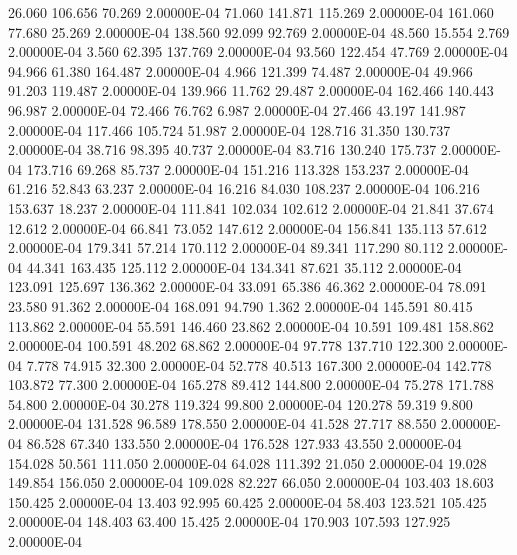     26.060   106.656    70.269  2.00000E-04
    71.060   141.871   115.269  2.00000E-04
   161.060    77.680    25.269  2.00000E-04
   138.560    92.099    92.769  2.00000E-04
    48.560    15.554     2.769  2.00000E-04
     3.560    62.395   137.769  2.00000E-04
    93.560   122.454    47.769  2.00000E-04
    94.966    61.380   164.487  2.00000E-04
     4.966   121.399    74.487  2.00000E-04
    49.966    91.203   119.487  2.00000E-04
   139.966    11.762    29.487  2.00000E-04
   162.466   140.443    96.987  2.00000E-04
    72.466    76.762     6.987  2.00000E-04
    27.466    43.197   141.987  2.00000E-04
   117.466   105.724    51.987  2.00000E-04
   128.716    31.350   130.737  2.00000E-04
    38.716    98.395    40.737  2.00000E-04
    83.716   130.240   175.737  2.00000E-04
   173.716    69.268    85.737  2.00000E-04
   151.216   113.328   153.237  2.00000E-04
    61.216    52.843    63.237  2.00000E-04
    16.216    84.030   108.237  2.00000E-04
   106.216   153.637    18.237  2.00000E-04
   111.841   102.034   102.612  2.00000E-04
    21.841    37.674    12.612  2.00000E-04
    66.841    73.052   147.612  2.00000E-04
   156.841   135.113    57.612  2.00000E-04
   179.341    57.214   170.112  2.00000E-04
    89.341   117.290    80.112  2.00000E-04
    44.341   163.435   125.112  2.00000E-04
   134.341    87.621    35.112  2.00000E-04
   123.091   125.697   136.362  2.00000E-04
    33.091    65.386    46.362  2.00000E-04
    78.091    23.580    91.362  2.00000E-04
   168.091    94.790     1.362  2.00000E-04
   145.591    80.415   113.862  2.00000E-04
    55.591   146.460    23.862  2.00000E-04
    10.591   109.481   158.862  2.00000E-04
   100.591    48.202    68.862  2.00000E-04
    97.778   137.710   122.300  2.00000E-04
     7.778    74.915    32.300  2.00000E-04
    52.778    40.513   167.300  2.00000E-04
   142.778   103.872    77.300  2.00000E-04
   165.278    89.412   144.800  2.00000E-04
    75.278   171.788    54.800  2.00000E-04
    30.278   119.324    99.800  2.00000E-04
   120.278    59.319     9.800  2.00000E-04
   131.528    96.589   178.550  2.00000E-04
    41.528    27.717    88.550  2.00000E-04
    86.528    67.340   133.550  2.00000E-04
   176.528   127.933    43.550  2.00000E-04
   154.028    50.561   111.050  2.00000E-04
    64.028   111.392    21.050  2.00000E-04
    19.028   149.854   156.050  2.00000E-04
   109.028    82.227    66.050  2.00000E-04
   103.403    18.603   150.425  2.00000E-04
    13.403    92.995    60.425  2.00000E-04
    58.403   123.521   105.425  2.00000E-04
   148.403    63.400    15.425  2.00000E-04
   170.903   107.593   127.925  2.00000E-04
